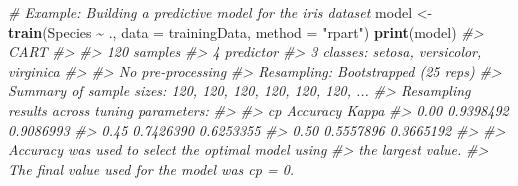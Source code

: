 \documentclass[
]{book}
\newenvironment{Shaded}{\begin{snugshade}}{\end{snugshade}}
\newcommand{\AttributeTok}[1]{\textcolor[rgb]{0.13,0.29,0.53}{#1}}
\newcommand{\CommentTok}[1]{\textcolor[rgb]{0.56,0.35,0.01}{\textit{#1}}}
\newcommand{\FunctionTok}[1]{\textcolor[rgb]{0.13,0.29,0.53}{\textbf{#1}}}
\newcommand{\NormalTok}[1]{#1}
\newcommand{\OtherTok}[1]{\textcolor[rgb]{0.56,0.35,0.01}{#1}}
\newcommand{\SpecialCharTok}[1]{\textcolor[rgb]{0.81,0.36,0.00}{\textbf{#1}}}
\newcommand{\StringTok}[1]{\textcolor[rgb]{0.31,0.60,0.02}{#1}}
\begin{document}
\begin{Shaded}
\begin{Highlighting}[]

\CommentTok{\# Example: Building a predictive model for the iris dataset}
\NormalTok{model }\OtherTok{\textless{}{-}} \FunctionTok{train}\NormalTok{(Species }\SpecialCharTok{\textasciitilde{}}\NormalTok{ ., }\AttributeTok{data =}\NormalTok{ trainingData, }\AttributeTok{method =} \StringTok{"rpart"}\NormalTok{)}
\FunctionTok{print}\NormalTok{(model)}
\CommentTok{\#\textgreater{} CART }
\CommentTok{\#\textgreater{} }
\CommentTok{\#\textgreater{} 120 samples}
\CommentTok{\#\textgreater{}   4 predictor}
\CommentTok{\#\textgreater{}   3 classes: \textquotesingle{}setosa\textquotesingle{}, \textquotesingle{}versicolor\textquotesingle{}, \textquotesingle{}virginica\textquotesingle{} }
\CommentTok{\#\textgreater{} }
\CommentTok{\#\textgreater{} No pre{-}processing}
\CommentTok{\#\textgreater{} Resampling: Bootstrapped (25 reps) }
\CommentTok{\#\textgreater{} Summary of sample sizes: 120, 120, 120, 120, 120, 120, ... }
\CommentTok{\#\textgreater{} Resampling results across tuning parameters:}
\CommentTok{\#\textgreater{} }
\CommentTok{\#\textgreater{}   cp    Accuracy   Kappa    }
\CommentTok{\#\textgreater{}   0.00  0.9398492  0.9086993}
\CommentTok{\#\textgreater{}   0.45  0.7426390  0.6253355}
\CommentTok{\#\textgreater{}   0.50  0.5557896  0.3665192}
\CommentTok{\#\textgreater{} }
\CommentTok{\#\textgreater{} Accuracy was used to select the optimal model using}
\CommentTok{\#\textgreater{}  the largest value.}
\CommentTok{\#\textgreater{} The final value used for the model was cp = 0.}


\end{Highlighting}
\end{Shaded}
\end{document}
